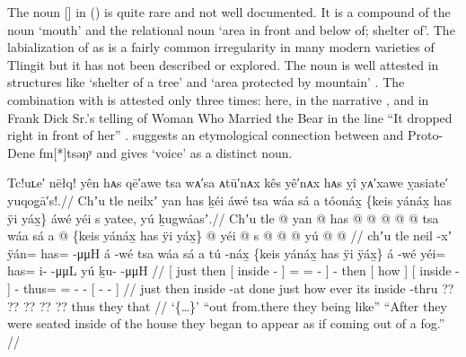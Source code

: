 
The noun  [] in (\lastx) is quite rare and not well documented.
It is a compound of the noun  ‘mouth’ and the relational noun  ‘area in front and below of; shelter of’.
The labialization of  as  is a fairly common irregularity in many modern varieties of Tlingit but it has not been described or explored.
The noun  is well attested in structures like  ‘shelter of a tree’ and  ‘area protected by mountain’ \parencite[09/48]{leer:1973}.
The combination with  is attested only three times: here, in the  narrative , and in  Frank Dick Sr.’s telling of Woman Who Married the Bear in the line  “It dropped right in front of her” \parencite[217.443]{dauenhauer:1987}.
\citeauthor{leer:1978b} suggests an etymological connection between  and Proto-Dene fm[*]{tsəŋʸ} \parencite[37]{leer:1978b} and gives  ‘voice’ as a distinct noun.

\ex\label{ex:89-90-}%
%
\begingl
	\glpreamble	Tc!uʟe′ nēłq! yên hᴀs qē′awe tsa wᴀ′sa ᴀtū′nᴀx kês yê′nᴀx hᴀs ỵî yᴀ′xawe ỵasiate′ yuqog̣ā′s!.//
	\glpreamble	Chʼu tle neilxʼ yan has ḵéi áwé tsa wáa sá a tóonáx̱ \{keis yánáx̱ has ÿi yáx̱\} áwé yéi s yatee, yú ḵugwáasʼ.//
	\gla	{} Chʼu tle {}  @ {} {}
			yan @ has @  @ {} @ {} @ {} {}
			 @ {} 
		tsa {} wáa sá {} 
		{} a  @ {} {}
		\{keis yánáx̱ has ÿi yáx̱\}
		 @ {}
		yéi @ s @  @ {} @ {}
		{} yú  @ {} @ {} {} //
	\glb	{} chʼu tle {} neil -xʼ {}
			ÿán= has= {}  -μμH {} {}
			á -wé
		tsa {} wáa sá {}
		{} a tú -náx̱ {}
		\{keis yánáx̱ has ÿi ÿáx̱\}
		á -wé
		yéi= has= i-  -μμL
		{} yú ḵu-  -μμH {} //
	\glc	{}[ just then {}[ inside - {}]
			= = \·  - \· {}]
			 -
		then {}[ how  {}]
		{}[  inside - {}]
		{} {} {} {} {}
		 -
		thus= = -  -
		{}[  -  - {}] //
	\gld	{} just then {} inside -at {}
			done  {} {} {} {}
			 {}
		just {} how ever {} {}
		{} its inside -thru {}
		?? ?? ?? ?? ??
		 {}
		thus they  {} {}
		{} that  {} {} {} //
	\glft	‘\{…\}’\newline
		“out from.there they being like”\newline
		“After they were seated inside of the house they began to appear as if coming out of a fog.”
		//
\endgl
\xe

